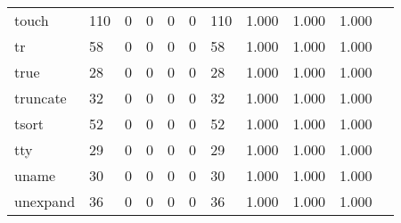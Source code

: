 \begin{longtable}{lp{1.10cm}p{1.10cm}p{1.10cm}p{1.10cm}p{1.10cm}p{1.10cm}p{1.10cm}p{1.10cm}p{1.10cm}p{1.10cm}}
touch     &                    110 &                                  0 &                                 0 &                                0 &                                 0 &                             110 &                          1.000 &                                 1.000 &                               1.000 \\
tr        &                     58 &                                  0 &                                 0 &                                0 &                                 0 &                              58 &                          1.000 &                                 1.000 &                               1.000 \\
true      &                     28 &                                  0 &                                 0 &                                0 &                                 0 &                              28 &                          1.000 &                                 1.000 &                               1.000 \\
truncate  &                     32 &                                  0 &                                 0 &                                0 &                                 0 &                              32 &                          1.000 &                                 1.000 &                               1.000 \\
tsort     &                     52 &                                  0 &                                 0 &                                0 &                                 0 &                              52 &                          1.000 &                                 1.000 &                               1.000 \\
tty       &                     29 &                                  0 &                                 0 &                                0 &                                 0 &                              29 &                          1.000 &                                 1.000 &                               1.000 \\
uname     &                     30 &                                  0 &                                 0 &                                0 &                                 0 &                              30 &                          1.000 &                                 1.000 &                               1.000 \\
unexpand  &                     36 &                                  0 &                                 0 &                                0 &                                 0 &                              36 &                          1.000 &                                 1.000 &                               1.000 \\

\end{longtable}
